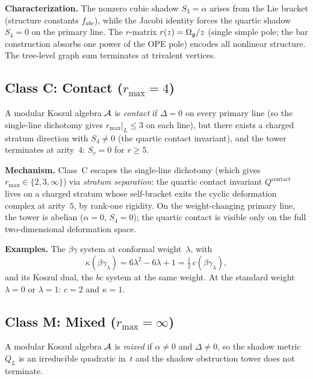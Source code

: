 \noindent\textbf{Characterization.}
The nonzero cubic shadow $S_3 = \alpha$ arises from the Lie bracket
(structure constants $f_{abc}$), while the Jacobi identity forces the
quartic shadow $S_4 = 0$ on the primary line. The $r$-matrix
$r(z) = \Omega_{\mathfrak{g}}/z$ (single simple pole; the bar construction absorbs
one power of the OPE pole) encodes all nonlinear structure. The tree-level
graph sum terminates at trivalent vertices.

\medskip

\subsection{Class C: Contact ($r_{\max} = 4$)}

\begin{definition}\label{def:class-C}
A modular Koszul algebra $\mathcal{A}$ is \emph{contact} if
$\Delta = 0$ on every primary line (so the single-line
dichotomy gives $r_{\max}|_L \leq 3$ on each line), but there
exists a charged stratum direction with $S_4 \neq 0$
(the quartic contact invariant), and the tower terminates at
arity~$4$: $S_r = 0$ for $r \geq 5$.
\end{definition}

\noindent\textbf{Mechanism.}
Class~C escapes the single-line dichotomy (which gives $r_{\max} \in
\{2, 3, \infty\}$) via \emph{stratum separation}: the quartic contact
invariant $Q^{\mathrm{contact}}$ lives on a charged stratum whose
self-bracket exits the cyclic deformation complex at arity~$5$, by
rank-one rigidity. On the weight-changing primary line, the tower is
abelian ($\alpha = 0$, $S_4 = 0$); the quartic contact is visible
only on the full two-dimensional deformation space.

\noindent\textbf{Examples.}
The $\beta\gamma$ system at conformal weight~$\lambda$, with
\[
\kappa(\beta\gamma_\lambda)
= 6\lambda^2 - 6\lambda + 1
= \tfrac{1}{2}\,c(\beta\gamma_\lambda),
\]
and its Koszul dual, the $bc$ system at the same weight.
At the standard weight $\lambda = 0$ or $\lambda = 1$:
$c = 2$ and $\kappa = 1$.

\medskip

\subsection{Class M: Mixed ($r_{\max} = \infty$)}

\begin{definition}\label{def:class-M}
A modular Koszul algebra $\mathcal{A}$ is \emph{mixed} if
$\alpha \neq 0$ and $\Delta \neq 0$, so the shadow metric
$Q_L$ is an irreducible quadratic in~$t$ and the shadow obstruction tower
does not terminate.
\end{definition}

